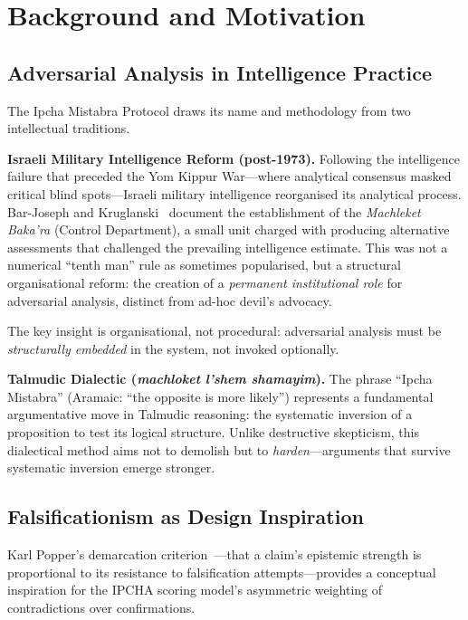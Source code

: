 \documentclass[11pt,a4paper]{article}
\begin{document}
\section{Background and Motivation}\label{sec:background}

\subsection{Adversarial Analysis in Intelligence Practice}

The Ipcha Mistabra Protocol draws its name and methodology from two
intellectual traditions.

\textbf{Israeli Military Intelligence Reform (post-1973).}
Following the intelligence failure that preceded the Yom Kippur
War---where analytical consensus masked critical blind spots---Israeli
military intelligence reorganised its analytical process.
Bar-Joseph and Kruglanski~\cite{barjoseph2003closure} document the
establishment of the \emph{Machleket Baka'ra} (Control Department),
a small unit charged with producing alternative assessments that
challenged the prevailing intelligence estimate.  This was not a
numerical ``tenth man'' rule as sometimes popularised, but a
structural organisational reform: the creation of a \emph{permanent
institutional role} for adversarial analysis, distinct from ad-hoc
devil's advocacy.

The key insight is organisational, not procedural: adversarial
analysis must be \emph{structurally embedded} in the system, not
invoked optionally.

\textbf{Talmudic Dialectic (\emph{machloket l'shem shamayim}).}
The phrase ``Ipcha Mistabra'' (Aramaic: ``the opposite is more
likely'') represents a fundamental argumentative move in Talmudic
reasoning: the systematic inversion of a proposition to test its
logical structure.  Unlike destructive skepticism, this dialectical
method aims not to demolish but to \emph{harden}---arguments that
survive systematic inversion emerge stronger.

\subsection{Falsificationism as Design Inspiration}

Karl Popper's demarcation criterion~\cite{popper1959logic}---that a
claim's epistemic strength is proportional to its resistance to
falsification attempts---provides a conceptual inspiration for the
IPCHA scoring model's asymmetric weighting of contradictions over
confirmations.
\end{document}
